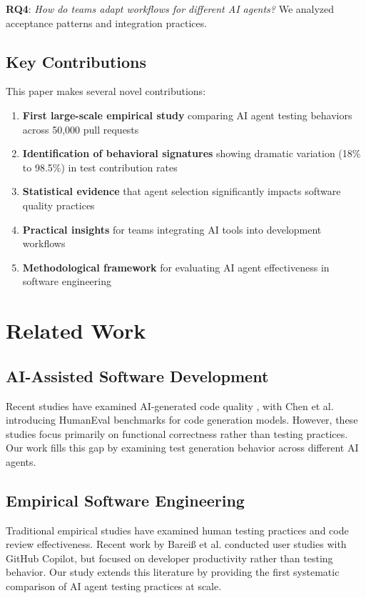 \documentclass[conference]{IEEEtran}
\begin{document}
\textbf{RQ4}: \textit{How do teams adapt workflows for different AI agents?} We analyzed acceptance patterns and integration practices.

\subsection{Key Contributions}

This paper makes several novel contributions:
\begin{enumerate}
    \item \textbf{First large-scale empirical study} comparing AI agent testing behaviors across 50,000 pull requests
    \item \textbf{Identification of behavioral signatures} showing dramatic variation (18\% to 98.5\%) in test contribution rates
    \item \textbf{Statistical evidence} that agent selection significantly impacts software quality practices
    \item \textbf{Practical insights} for teams integrating AI tools into development workflows
    \item \textbf{Methodological framework} for evaluating AI agent effectiveness in software engineering
\end{enumerate}

\section{Related Work}

\subsection{AI-Assisted Software Development}

Recent studies have examined AI-generated code quality \cite{b3}, with Chen et al. introducing HumanEval benchmarks for code generation models. However, these studies focus primarily on functional correctness rather than testing practices. Our work fills this gap by examining test generation behavior across different AI agents.

\subsection{Empirical Software Engineering}

Traditional empirical studies have examined human testing practices and code review effectiveness. Recent work by Bareiß et al. \cite{b4} conducted user studies with GitHub Copilot, but focused on developer productivity rather than testing behavior. Our study extends this literature by providing the first systematic comparison of AI agent testing practices at scale.
\end{document}
